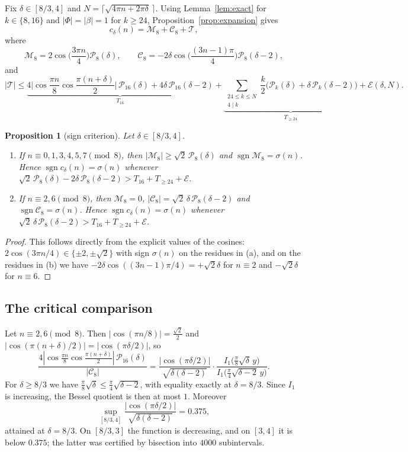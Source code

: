 \documentclass[11pt]{amsart}
\newtheorem{proposition}[theorem]{Proposition}
\theoremstyle{remark}
\theoremstyle{definition}
\newcommand{\cP}{\mathcal P}
\newcommand{\cE}{\mathcal E}
\newcommand{\sgn}{\operatorname{sgn}}
\begin{document}
Fix $\delta\in[8/3,4]$ and $N=\lceil\sqrt{4\pi n+2\pi\delta}\,\rceil$. Using Lemma~\ref{lem:exact} for $k\in\{8,16\}$ and $|\Phi|=|\beta|=1$ for $k\ge24$, Proposition~\ref{prop:expansion} gives
\[
c_\delta(n)=\mathcal M_8+\mathcal C_8+\mathcal T,
\]
where
\[
\mathcal M_8=2\cos\Big(\frac{3\pi n}4\Big)\cP_8(\delta),\qquad \mathcal C_8=-2\delta\cos\Big(\frac{(3n-1)\pi}4\Big)\cP_8(\delta-2),
\]
and
\begin{equation}\label{eq:T}
|\mathcal T|\le\underbrace{4\Big|\cos\frac{\pi n}8\cos\frac{\pi(n+\delta)}2\Big|\,\cP_{16}(\delta)+4\delta\,\cP_{16}(\delta-2)}_{T_{16}}+\underbrace{\sum_{\substack{24\le k\le N\\4\mid k}}\frac k2\big(\cP_k(\delta)+\delta\,\cP_k(\delta-2)\big)}_{T_{\ge24}}+\cE(\delta,N).
\end{equation}

\begin{proposition}[sign criterion]\label{prop:criterion}
Let $\delta\in[8/3,4]$.
\begin{enumerate}[label=(\alph*),leftmargin=2em]
\item If $n\equiv0,1,3,4,5,7\pmod 8$, then $|\mathcal M_8|\ge\sqrt2\,\cP_8(\delta)$ and $\sgn\mathcal M_8=\sigma(n)$. Hence $\sgn c_\delta(n)=\sigma(n)$ whenever $\sqrt2\,\cP_8(\delta)-2\delta\,\cP_8(\delta-2)>T_{16}+T_{\ge24}+\cE$.
\item If $n\equiv2,6\pmod8$, then $\mathcal M_8=0$, $|\mathcal C_8|=\sqrt2\,\delta\,\cP_8(\delta-2)$ and $\sgn\mathcal C_8=\sigma(n)$. Hence $\sgn c_\delta(n)=\sigma(n)$ whenever $\sqrt2\,\delta\,\cP_8(\delta-2)>T_{16}+T_{\ge24}+\cE$.
\end{enumerate}
\end{proposition}

\begin{proof}
This follows directly from the explicit values of the cosines: $2\cos(3\pi n/4)\in\{\pm2,\pm\sqrt2\}$ with sign $\sigma(n)$ on the residues in (a), and on the residues in (b) we have $-2\delta\cos((3n-1)\pi/4)=+\sqrt2\delta$ for $n\equiv2$ and $-\sqrt2\delta$ for $n\equiv6$.
\end{proof}

\subsection{The critical comparison}
Let $n\equiv2,6\pmod 8$. Then $|\cos(\pi n/8)|=\tfrac{\sqrt2}2$ and $|\cos(\pi(n+\delta)/2)|=|\cos(\pi\delta/2)|$, so
\begin{equation}\label{eq:critical}
\frac{4|\cos\frac{\pi n}8\cos\frac{\pi(n+\delta)}2|\,\cP_{16}(\delta)}{|\mathcal C_8|}=\frac{|\cos(\pi\delta/2)|}{\sqrt{\delta(\delta-2)}}\cdot\frac{I_1\big(\frac\pi8\sqrt\delta\,y\big)}{I_1\big(\frac\pi4\sqrt{\delta-2}\,y\big)}.
\end{equation}
For $\delta\ge8/3$ we have $\frac\pi8\sqrt\delta\le\frac\pi4\sqrt{\delta-2}$, with equality exactly at $\delta=8/3$. Since $I_1$ is increasing, the Bessel quotient is then at most $1$. Moreover
\[
\sup_{[8/3,4]}\frac{|\cos(\pi\delta/2)|}{\sqrt{\delta(\delta-2)}}=0.375,
\]
attained at $\delta=8/3$. On $[8/3,3]$ the function is decreasing, and on $[3,4]$ it is below $0.375$; the latter was certified by bisection into $4000$ subintervals.
\end{document}
